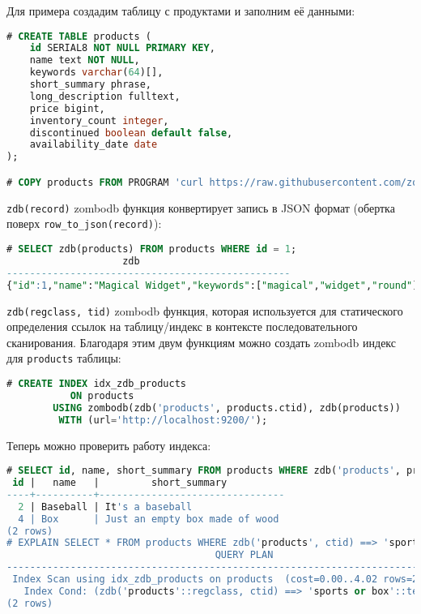 Для примера создадим таблицу с продуктами и заполним её данными:

\begin{lstlisting}[language=SQL,label=lst:zombodb4,caption=Products table]
# CREATE TABLE products (
    id SERIAL8 NOT NULL PRIMARY KEY,
    name text NOT NULL,
    keywords varchar(64)[],
    short_summary phrase,
    long_description fulltext,
    price bigint,
    inventory_count integer,
    discontinued boolean default false,
    availability_date date
);

# COPY products FROM PROGRAM 'curl https://raw.githubusercontent.com/zombodb/zombodb/master/TUTORIAL-data.dmp';
\end{lstlisting}

\lstinline!zdb(record)! zombodb функция конвертирует запись в JSON формат (обертка поверх \lstinline!row_to_json(record)!):

\begin{lstlisting}[language=SQL,label=lst:zombodb5,caption=Zdb]
# SELECT zdb(products) FROM products WHERE id = 1;
                    zdb
-------------------------------------------------
{"id":1,"name":"Magical Widget","keywords":["magical","widget","round"],"short_summary":"A widget that is quite magical","long_description":"Magical Widgets come from the land of Magicville and are capable of things you can't imagine","price":9900,"inventory_count":42,"discontinued":false,"availability_date":"2015-08-31"}
\end{lstlisting}

\lstinline!zdb(regclass, tid)! zombodb функция, которая используется для статического определения ссылок на таблицу/индекс в контексте последовательного сканирования. Благодаря этим двум функциям можно создать zombodb индекс для \lstinline!products! таблицы:

\begin{lstlisting}[language=SQL,label=lst:zombodb6,caption=Zdb]
# CREATE INDEX idx_zdb_products
           ON products
        USING zombodb(zdb('products', products.ctid), zdb(products))
         WITH (url='http://localhost:9200/');
\end{lstlisting}

Теперь можно проверить работу индекса:

\begin{lstlisting}[language=SQL,label=lst:zombodb7,caption=Index usage]
# SELECT id, name, short_summary FROM products WHERE zdb('products', products.ctid) ==> 'sports or box';
 id |   name   |         short_summary
----+----------+--------------------------------
  2 | Baseball | It's a baseball
  4 | Box      | Just an empty box made of wood
(2 rows)
# EXPLAIN SELECT * FROM products WHERE zdb('products', ctid) ==> 'sports or box';
                                    QUERY PLAN
-----------------------------------------------------------------------------------
 Index Scan using idx_zdb_products on products  (cost=0.00..4.02 rows=2 width=153)
   Index Cond: (zdb('products'::regclass, ctid) ==> 'sports or box'::text)
(2 rows)
\end{lstlisting}

